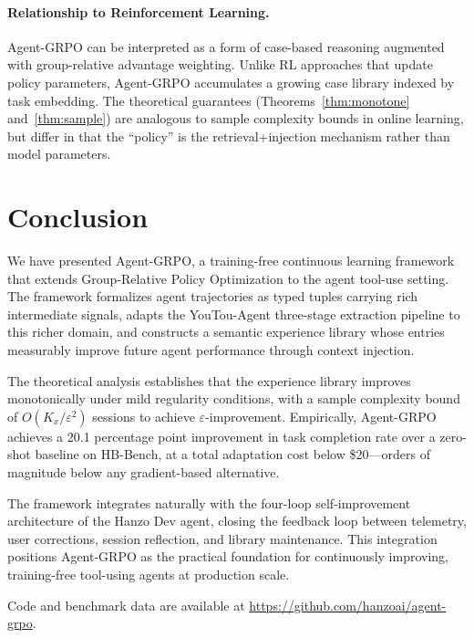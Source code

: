 \documentclass[11pt]{article}
\begin{document}
\paragraph{Relationship to Reinforcement Learning.}
Agent-GRPO can be interpreted as a form of case-based reasoning augmented with
group-relative advantage weighting. Unlike RL approaches that update policy
parameters, Agent-GRPO accumulates a growing case library indexed by task
embedding. The theoretical guarantees (Theorems~\ref{thm:monotone}
and~\ref{thm:sample}) are analogous to sample complexity bounds in online
learning, but differ in that the ``policy'' is the retrieval+injection
mechanism rather than model parameters.

\section{Conclusion}
\label{sec:conclusion}

We have presented Agent-GRPO, a training-free continuous learning framework
that extends Group-Relative Policy Optimization to the agent tool-use setting.
The framework formalizes agent trajectories as typed tuples carrying rich
intermediate signals, adapts the YouTou-Agent three-stage extraction pipeline
to this richer domain, and constructs a semantic experience library whose
entries measurably improve future agent performance through context injection.

The theoretical analysis establishes that the experience library improves
monotonically under mild regularity conditions, with a sample complexity bound
of $O(K_x/\varepsilon^2)$ sessions to achieve $\varepsilon$-improvement.
Empirically, Agent-GRPO achieves a 20.1 percentage point improvement in task
completion rate over a zero-shot baseline on HB-Bench, at a total adaptation
cost below \$20---orders of magnitude below any gradient-based alternative.

The framework integrates naturally with the four-loop self-improvement
architecture of the Hanzo Dev agent, closing the feedback loop between
telemetry, user corrections, session reflection, and library maintenance.
This integration positions Agent-GRPO as the practical foundation for
continuously improving, training-free tool-using agents at production scale.

Code and benchmark data are available at \url{https://github.com/hanzoai/agent-grpo}.
\end{document}
